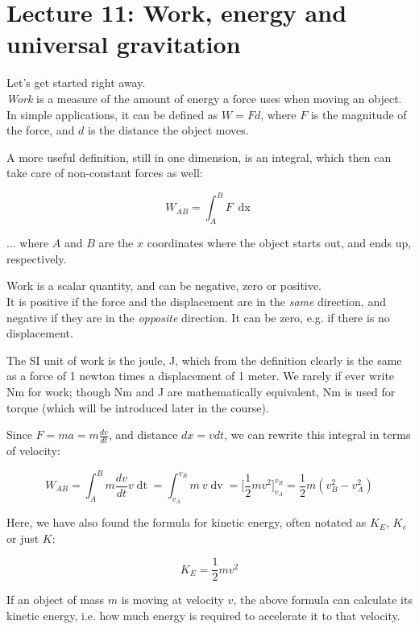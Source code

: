 \section{Lecture 11: Work, energy and universal gravitation}

Let's get started right away.\\
\emph{Work} is a measure of the amount of energy a force uses when moving an object. In simple applications, it can be defined as $W = F d$, where $F$ is the magnitude of the force, and $d$ is the distance the object moves.

A more useful definition, still in one dimension, is an integral, which then can take care of non-constant forces as well:

\begin{equation}
W_{AB} = \int_A^B F\ \mathop{dx}
\end{equation}

... where $A$ and $B$ are the $x$ coordinates where the object starts out, and ends up, respectively.

Work is a scalar quantity, and can be negative, zero or positive.\\
It is positive if the force and the displacement are in the \emph{same} direction, and negative if they are in the \emph{opposite} direction. It can be zero, e.g. if there is no displacement.

The SI unit of work is the joule, J, which from the definition clearly is the same as a force of 1 newton times a displacement of 1 meter. We rarely if ever write Nm for work; though Nm and J are mathematically equivalent, Nm is used for torque (which will be introduced later in the course).

Since $\displaystyle F = m a = m \frac{dv}{dt}$, and distance $dx = v dt$, we can rewrite this integral in terms of velocity:

\begin{equation}
W_{AB} = \int_A^B m \frac{dv}{dt} v \mathop{dt} = \int_{v_A}^{v_B} m\ v \mathop{dv} = \Big[ \frac{1}{2} m v^2 \Big]_{v_A}^{v_B} = \frac{1}{2} m \left(v_B^2 - v_A^2\right)
\end{equation}

Here, we have also found the formula for kinetic energy, often notated as $K_E$, $K_e$ or just $K$:

\begin{equation}
K_E = \frac{1}{2} m v^2
\end{equation}

If an object of mass $m$ is moving at velocity $v$, the above formula can calculate its kinetic energy, i.e. how much energy is required to accelerate it to that velocity.

